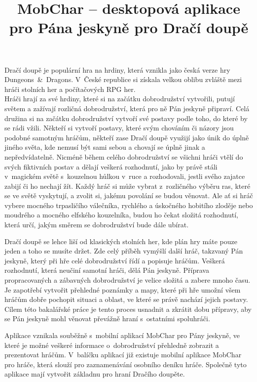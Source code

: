 \documentclass[thesis=B,czech]{resources/FITthesis}[2012/06/26]
\title{	MobChar -- desktopová aplikace pro Pána jeskyně pro Dračí doupě}
\begin{document}

\begin{introduction}
Dračí doupě je populární hra na hrdiny, která vznikla jako česká verze hry Dungeons~\&~Dragons. V~České republice si získala velkou oblibu zvláště mezi hráči stolních her a počítačových RPG her.\\

Hráči hrají za své hrdiny, které si na začátku dobrodružství vytvořili, putují světem a zažívají rozličná dobrodružství, která pro ně Pán jeskyně připraví. Celá družina si na začátku dobrodružství vytvoří své postavy podle toho, do které by se rádi vžili. Někteří si vytvoří postavy, které svým chováním či názory jsou podobné samotným hráčům, někteří zase Dračí doupě využijí jako únik do úplně jiného světa, kde nemusí být sami sebou a chovají se úplně jinak a nepředvídatelně. Nicméně během celého dobrodružství se všichni hráči vtělí do svých fiktivních postav a dělají veškerá rozhodnutí, jako by právě stáli v~magickém světě s~kouzelnou hůlkou v~ruce a rozhodovali, jestli svého zajatce zabijí či ho nechají žít.
Každý hráč si může vybrat z~rozličného výběru ras, které se ve světě vyskytují, a zvolit si, jakému povolání se budou věnovat. Ale ať si hráč vybere mocného trpasličího válečníka, rychlého a úskočného hobitího zloděje nebo moudrého a mocného elfského kouzelníka, budou ho čekat složitá rozhodnutí, která určí, jakým směrem se dobrodružství bude dále ubírat. \par

Dračí doupě se lehce liší od klasických stolních her, kde plán hry máte pouze jeden a toho se musíte držet. Zde celý příběh vymýšlí další hráč, takzvaný Pán jeskyně, který při hře celé dobrodružství řídí a popisuje hráčům. Veškerá rozhodnutí, která neučiní samotní hráči, dělá Pán jeskyně. Příprava propracovaných a zábavných dobrodružství je velice složitá a zabere mnoho času. Je zapotřebí vytvořit přehledné poznámky a mapy, které při hře umožní všem hráčům dobře pochopit situaci a oblast, ve které se právě nachází jejich postavy. Cílem této bakalářské práce je tento proces usnadnit a zkrátit dobu přípravy, aby se Pán jeskyně mohl věnovat převážně hraní s~ostatními spoluhráči. \par

Aplikace vznikala souběžně s~mobilní aplikací MobChar pro Pány jeskyně\cite{Shanel_2017}, ve které je možné veškeré informace o~dobrodružství přehledně zobrazit a prezentovat hráčům. V~balíčku aplikací již existuje mobilní aplikace MobChar pro hráče, která slouží pro zaznamenávání osobního deníku hráče\cite{Weberova_2017}. Společně tyto aplikace mají vytvořit základnu pro hraní Dračího doupěte. 


\end{introduction}
\end{document}
